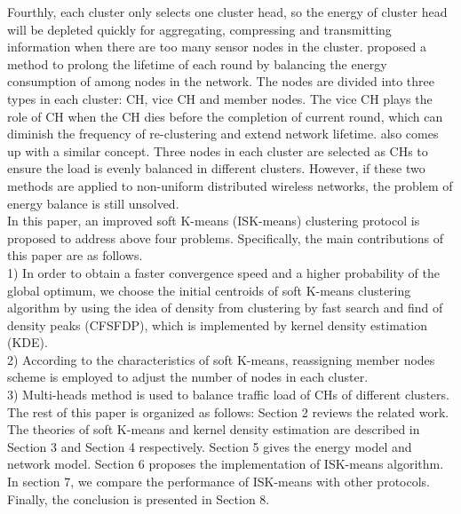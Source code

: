 \documentclass[11pt]{report}
\begin{document}
	 Fourthly, each cluster only selects one cluster head, so the energy of cluster head will be depleted quickly for aggregating, compressing and transmitting information when there are too many sensor nodes in the cluster. \cite{Sangameswaran} proposed a method to prolong the lifetime of each round by balancing the energy consumption of among nodes in the network. The nodes are divided into three types in each cluster: CH, vice CH and member nodes. The vice CH plays the role of CH when the CH dies before the completion of current round, which can diminish the frequency of re-clustering and extend network lifetime. \cite{doi:10.1155/2016/5040475} also comes up with a similar concept. Three nodes in each cluster are selected as CHs to ensure the load is evenly balanced in different clusters. However, if these two methods are applied to non-uniform distributed wireless networks, the problem of energy balance is still unsolved. \\
	
	
    
    \noindent In this paper, an improved soft K-means (ISK-means) clustering protocol is proposed to address above four problems. Specifically, the main contributions of this paper are as follows.\\ 
    1) In order to obtain a faster convergence speed and a higher probability of the global optimum, we choose the initial centroids of soft K-means \cite{report} clustering algorithm by using the idea of density from clustering by fast search and find of density peaks (CFSFDP), which is implemented by kernel density estimation (KDE). \\
    2) According to the characteristics of soft K-means, reassigning member nodes scheme is employed to adjust the number of nodes in each cluster. \\
    3) Multi-heads method is used to balance traffic load of CHs of different clusters.\\
    
    \noindent The rest of this paper is organized as follows: Section 2 reviews the related work. The theories of soft K-means and kernel density estimation are described in Section 3 and Section 4 respectively. Section 5 gives the energy model and network model. Section 6 proposes the implementation of ISK-means algorithm. In section 7, we compare the performance of ISK-means with other protocols. Finally, the conclusion is presented in Section 8.
    
\end{document}
